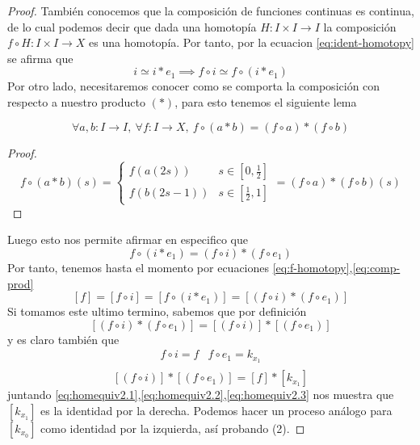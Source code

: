 \begin{proof}
También conocemos que la composición de funciones continuas es
continua, de lo cual podemos decir que dada una homotopía \(H : I \times
I \to I\) la composición \( f \circ H : I \times I \to X\) es una
homotopía. Por tanto, por la ecuacion \eqref{eq:ident-homotopy} se
afirma que
\begin{equation}\label{eq:f-homotopy}
i \simeq i * e_1 \implies f \circ i \simeq f \circ \left( i * e_1 \right)
\end{equation}
Por otro lado, necesitaremos conocer como se comporta la composición con
respecto a nuestro producto \(\left( * \right)\), para esto tenemos el
siguiente lema
\begin{lema}
\label{lema:dist-composición-producto}
\[\forall a,b : I \to I,\ \forall f : I \to X,\ f \circ (a * b) = (f
\circ a) * (f \circ b) \]
\end{lema}
\begin{proof}
  \[ f \circ (a*b) (s) =
    \begin{cases}
      f \left( a(2s) \right) & s \in [0,\frac{1}{2}] \\
      f \left( b(2s - 1) \right) & s \in [\frac{1}{2} , 1]
    \end{cases}
    = \left( f \circ a \right) * \left(f \circ b \right) \left( s \right)
  \]
\end{proof}
\noindent Luego esto nos permite afirmar en especifico que
\begin{equation} \label{eq:comp-prod}
  f \circ \left( i * e_1 \right) = (f \circ i) * (f \circ e_1)
\end{equation}
Por tanto, tenemos hasta el momento por ecuaciones
\eqref{eq:f-homotopy},\eqref{eq:comp-prod}
\begin{equation}\label{eq:homequiv2.1}
[f] = [f \circ i] = [f \circ (i * e_1)] = [(f \circ i) * (f \circ e_1)]
\end{equation}
Si tomamos este ultimo termino, sabemos que por definición
\begin{equation}\label{eq:homequiv2.2}
[(f \circ i) * (f \circ e_1)] = [(f \circ i)] * [(f \circ e_1)]
\end{equation}
y es claro también que
\[
  \begin{matrix}
    f \circ i = f & f \circ e_1 = k_{x_1} \\
  \end{matrix}
\]
\begin{equation}\label{eq:homequiv2.3}
[(f \circ i)] * [(f \circ e_1)] = [f] * [k_{x_1}]
\end{equation}
juntando
\eqref{eq:homequiv2.1},\eqref{eq:homequiv2.2},\eqref{eq:homequiv2.3} nos
muestra que \([k_{x_1}]\) es la identidad por la derecha. Podemos
hacer un proceso análogo para \([k_{x_0}]\) como identidad por la
izquierda, así probando (2).


\end{proof}
